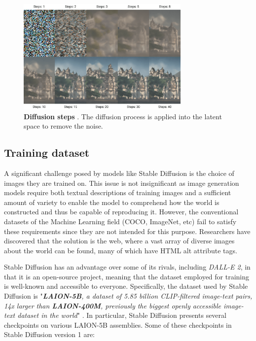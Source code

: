 \begin{figure}
    \centering
    \includegraphics[width=0.75\textwidth]{Pictures/DProcess.png} 
    \caption{\textbf{Diffusion steps} \cite{wikiStableDiffusion}. The diffusion process is applied into the latent space to remove the noise.}
    \label{fig:DProcess}
\end{figure}

\subsection{Training dataset}

A significant challenge posed by models like Stable Diffusion is the choice of images they are trained on. This issue is not insignificant as image generation models require both textual descriptions of training images and a sufficient amount of variety to enable the model to comprehend how the world is constructed and thus be capable of reproducing it. However, the conventional datasets of the Machine Learning field (COCO, ImageNet, etc) fail to satisfy these requirements since they are not intended for this purpose. Researchers have discovered that the solution is the web, where a vast array of diverse images about the world can be found, many of which have HTML alt attribute tags.

Stable Diffusion has an advantage over some of its rivals, including \textit{DALL-E 2}, in that it is an open-source project, meaning that the dataset employed for training is well-known and accessible to everyone. Specifically, the dataset used by Stable Diffusion is "\textit{\textbf{LAION-5B}, a dataset of 5.85 billion CLIP-filtered image-text pairs, 14x larger than \textbf{LAION-400M}, previously the biggest openly accessible image-text dataset in the world}" \cite{schuhmann2022laion}. In particular, Stable Diffusion presents several checkpoints on various LAION-5B assemblies. Some of these checkpoints in Stable Diffusion version 1 \cite{SDCardHF} are:

